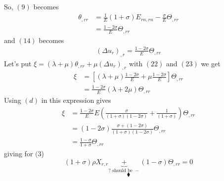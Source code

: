 So, $(9)$ becomes
\begin{align}
\theta_{,rr}&= \frac{1}{E}\left(1+\sigma\right)E_{rn,rn}- \frac{\sigma}{E} \Theta_{,rr} \\
&=\frac{1-2\sigma}{E}\Theta_{,rr} 
\end{align}
and  $(14)$ becomes
\begin{align}
\left(\Delta u_r\right)_{,r}=\frac{1-2\sigma}{E}\Theta_{,rr} 
\end{align}
Let's put $\xi= \left(\lambda+\mu\right)\theta_{,rr}+\mu\left(\Delta u_r\right)_{,r}$ with $(22)$ and $(23)$ we get
\begin{align}
\xi &= \left[\left(\lambda+\mu\right)\frac{1-2\sigma}{E}+\mu \frac{1-2\sigma}{E}\right]\Theta_{,rr} \\
&= \frac{1-2\sigma}{E}\left(\lambda+2\mu\right)\Theta_{,rr}
\end{align}
Using $(d)$ in this expression gives 
\begin{align}
\xi&= \frac{1-2\sigma}{E}E\left(\frac{\sigma}{\left(1+\sigma\right)\left(1-2\sigma\right)}+ \frac{1}{\left(1+\sigma\right)}\right)\Theta_{,rr}\\
&= \left(1-2\sigma\right)\frac{\sigma+\left(1-2\sigma\right)}{\left(1+\sigma\right)\left(1-2\sigma\right)}\Theta_{,rr}\\
&= \frac{1-\sigma}{1+\sigma}\Theta_{,rr}
\end{align}
giving for $(3$)
$$\left(1+\sigma\right)\rho X_{r,r} \underbrace{+}_{?\text{ should be } -}\left(1-\sigma \right)\Theta_{,rr}=0$$
$$\blacklozenge$$
\newpage

